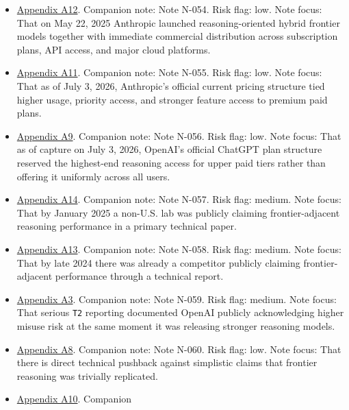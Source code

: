 \documentclass[
  american,
  11pt,
  letterpaper,
]{article}
\providecommand{\tightlist}{%
  \setlength{\itemsep}{0pt}\setlength{\parskip}{0pt}}
\begin{document}
\begin{itemize}
\tightlist
\item
  \hyperref[appendix-a12-introducing-claude-4]{Appendix A12}. Companion
  note: Note N-054. Risk flag: low. Note focus: That on May 22, 2025
  Anthropic launched reasoning-oriented hybrid frontier models together
  with immediate commercial distribution across subscription plans, API
  access, and major cloud platforms.
\item
  \hyperref[appendix-a11-plans-pricing-claude-by-anthropic]{Appendix
  A11}. Companion note: Note N-055. Risk flag: low. Note focus: That as
  of July 3, 2026, Anthropic's official current pricing structure tied
  higher usage, priority access, and stronger feature access to premium
  paid plans.
\item
  \hyperref[appendix-a9-chatgpt-plans-free-go-plus-pro-business-and-enterprise]{Appendix
  A9}. Companion note: Note N-056. Risk flag: low. Note focus: That as
  of capture on July 3, 2026, OpenAI's official ChatGPT plan structure
  reserved the highest-end reasoning access for upper paid tiers rather
  than offering it uniformly across all users.
\item
  \hyperref[appendix-a14-deepseek-r1-incentivizing-reasoning-capability-in-llms-via-reinforcement-learning]{Appendix
  A14}. Companion note: Note N-057. Risk flag: medium. Note focus: That
  by January 2025 a non-U.S. lab was publicly claiming frontier-adjacent
  reasoning performance in a primary technical paper.
\item
  \hyperref[appendix-a13-deepseek-v3-technical-report]{Appendix A13}.
  Companion note: Note N-058. Risk flag: medium. Note focus: That by
  late 2024 there was already a competitor publicly claiming
  frontier-adjacent performance through a technical report.
\item
  \hyperref[appendix-a3-openai-acknowledges-new-models-increase-risk-of-misuse-to-create-bioweapons]{Appendix
  A3}. Companion note: Note N-059. Risk flag: medium. Note focus: That
  serious \texttt{T2} reporting documented OpenAI publicly acknowledging
  higher misuse risk at the same moment it was releasing stronger
  reasoning models.
\item
  \hyperref[appendix-a8-it-s-not-that-simple-an-analysis-of-simple-test-time-scaling]{Appendix
  A8}. Companion note: Note N-060. Risk flag: low. Note focus: That
  there is direct technical pushback against simplistic claims that
  frontier reasoning was trivially replicated.
\item
  \hyperref[appendix-a10-pricing-openai-api]{Appendix A10}. Companion

\end{itemize}
\end{document}
